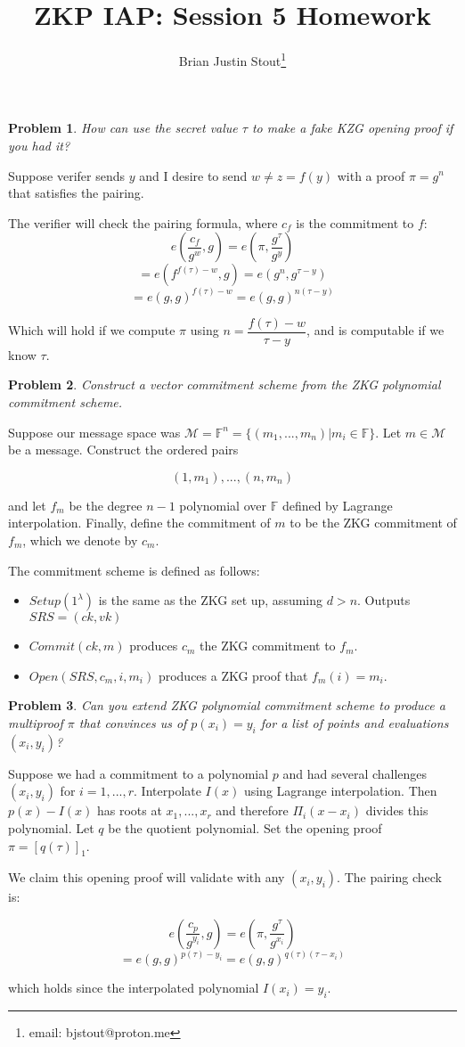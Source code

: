 \documentclass[12pt,letterpaper]{article}
\def\FF{{\mathbb F}}
\theoremstyle{plain}
\newtheorem{prb}{Problem}
\theoremstyle{definition}
\begin{document}
\title{ZKP IAP: Session 5 Homework}
\author{Brian Justin Stout\footnote{email: bjstout@proton.me}}
\maketitle

\begin{prb}\label{P1}
How can use the secret value $\tau$ to make a fake KZG opening proof if you had it?
\end{prb}
Suppose verifer sends $y$ and I desire to send $w\neq z=f(y)$ with a proof $\pi=g^n$ that satisfies the pairing.

The verifier will check the pairing formula, where $c_f$ is the commitment to $f$:
$$e(\frac{c_f}{g^w},g)=e(\pi,\frac{g^\tau}{g^y})$$
$$=e(f^{f(\tau)-w},g)=e(g^n,g^{\tau-y})$$
$$=e(g,g)^{f(\tau)-w}=e(g,g)^{n(\tau-y)}$$

Which will hold if we compute $\pi$ using $n=\dfrac{f(\tau)-w}{\tau - y}$, and is computable if we know $\tau$.


\begin{prb}\label{P2}
Construct a vector commitment scheme from the ZKG polynomial commitment scheme.
\end{prb}
Suppose our message space was $\mathcal{M}=\FF^n=\{(m_1,...,m_n)| m_i\in\FF\}$. Let $m\in\mathcal{M}$ be a message. Construct the ordered pairs

$$(1,m_1),...,(n,m_n)$$

and let $f_m$ be the degree $n-1$ polynomial over $\FF$ defined by Lagrange interpolation. Finally, define the commitment of $m$ to be the ZKG commitment of $f_m$, which we denote by $c_m$.

The commitment scheme is defined as follows:
\begin{itemize}
    \item $Setup(1^\lambda)$ is the same as the ZKG set up, assuming $d>n$. Outputs $SRS=(ck,vk)$
    \item $Commit(ck,m)$ produces $c_m$ the ZKG commitment to $f_m$.
    \item $Open(SRS, c_m, i, m_i)$ produces a ZKG proof that $f_m(i)=m_i$.
\end{itemize}

\begin{prb}\label{P3}
Can you extend ZKG polynomial commitment scheme to produce a multiproof $\pi$ that convinces us of $p(x_i)=y_i$ for a list of points and evaluations $(x_i,y_i)$?
\end{prb}

Suppose we had a commitment to a polynomial $p$ and had several challenges $(x_i,y_i)$ for $i=1,...,r$.  Interpolate $I(x)$ using Lagrange interpolation. Then $p(x)-I(x)$ has roots at $x_1,...,x_r$ and therefore $\Pi_i(x-x_i)$ divides this polynomial. Let $q$ be the quotient polynomial. Set the opening proof $\pi=[q(\tau)]_1$.

We claim this opening proof will validate with any $(x_i,y_i)$. The pairing check is:

$$e(\frac{c_p}{g^{y_i}},g)=e(\pi,\frac{g^\tau}{g^{x_i}})$$
$$=e(g,g)^{p(\tau)-y_i}=e(g,g)^{q(\tau)(\tau-x_i)}$$

which holds since the interpolated polynomial $I(x_i)=y_i$.
\end{document}
